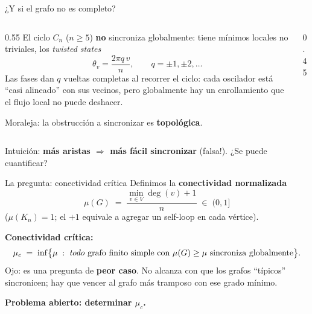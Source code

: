 \documentclass[10pt,aspectratio=169]{beamer}
\begin{document}
\begin{frame}{¿Y si el grafo no es completo?}
\begin{columns}
\begin{column}{0.55\textwidth}
El ciclo $C_n$ ($n\ge 5$) \textbf{no} sincroniza globalmente: tiene mínimos locales no triviales, los \emph{twisted states}
\[
\theta_v = \frac{2\pi q\, v}{n}, \qquad q = \pm 1, \pm 2, \dots
\]
Las fases dan $q$ vueltas completas al recorrer el ciclo: cada oscilador está ``casi alineado'' con sus vecinos, pero globalmente hay un enrollamiento que el flujo local no puede deshacer.
\medskip

Moraleja: la obstrucción a sincronizar es \textbf{topológica}.
\end{column}
\begin{column}{0.45\textwidth}
\centering
{}
\end{column}
\end{columns}
\medskip
\pause
Intuición: \textbf{más aristas $\Rightarrow$ más fácil sincronizar} (falsa!). ¿Se puede cuantificar?
\end{frame}

\begin{frame}{La pregunta: conectividad crítica}
Definimos la \textbf{conectividad normalizada}
\[
\mu(G) \;=\; \frac{\min_{v\in V}\deg(v) + 1}{n} \;\in\; (0,1]
\]
($\mu(K_n)=1$; el $+1$ equivale a agregar un self-loop en cada vértice).
\pause
\medskip

\textbf{Conectividad crítica:}
\[
\mu_c \;=\; \inf\bigl\{\mu \;:\; \text{\emph{todo} grafo finito simple con } \mu(G)\ge\mu \text{ sincroniza globalmente}\bigr\}.
\]
\medskip
Ojo: es una pregunta de \textbf{peor caso}. No alcanza con que los grafos ``típicos'' sincronicen; hay que vencer al grafo más tramposo con ese grado mínimo.
\pause
\medskip

\begin{center}
\Large \textbf{Problema abierto: determinar $\mu_c$.}
\end{center}
\end{frame}
\end{document}
